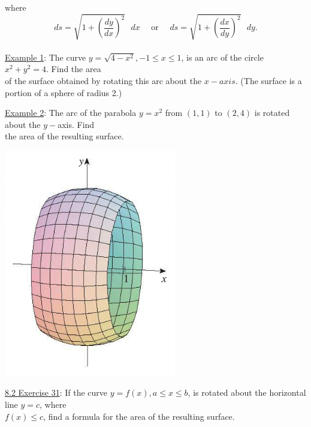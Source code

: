 \documentclass[paper=a4, fontsize=11pt]{scrartcl} %
\numberwithin{equation}{section} %
\numberwithin{figure}{section} %
\numberwithin{table}{section} %
\newcommand{\ds}{\displaystyle}
\begin{document}
where
\[ds = \ds\sqrt{1+\left(\ds\frac{dy}{dx}\right)^2}\text{ }dx \quad \text{ or } \quad ds = \ds\sqrt{1+\left(\ds\frac{dx}{dy}\right)^2}\text{ }dy.\]
\indent\\
\indent
 \newpage
\underline{Example 1}: The curve $y=\ds\sqrt{4-x^2}, -1\leq x \leq 1$, is an arc of the circle $x^2 + y^2 = 4$. Find the area \\
\hspace{0.85in} of the surface obtained by rotating this arc about the $x-axis$. (The surface is a\\
\hspace{0.85in} portion of a sphere of radius 2.)

\vspace{3.5in}

\underline{Example 2}: The arc of the parabola $y=x^2$ from $(1,1)$ to $(2,4)$ is rotated about the $y-$axis. Find \\
\hspace{0.87in} the area of the resulting surface.\\
\indent

 \includegraphics[scale=0.45]{8-2pic3.png}\\

\newpage


\underline{8.2 Exercise 31}: If the curve $y=f(x), a\leq x \leq b$, is rotated about the horizontal line $y=c$, where \\
\hspace{1.15in} $f(x)\leq c$, find a formula for the area of the resulting surface.\\
\indent
\end{document}
